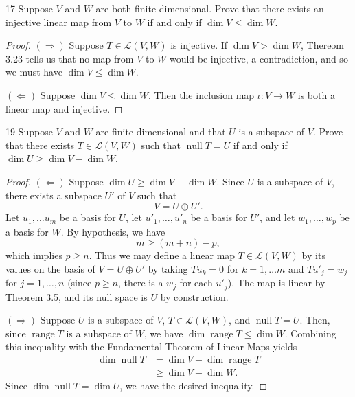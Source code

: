 \documentclass{extarticle}
\newenvironment{problem}[1]{\begin{prob*}{#1}{}}{\end{prob*}}
\newcommand{\Hom}{\mathcal{L}}
\DeclareMathOperator{\Null}{null}
\DeclareMathOperator{\Range}{range}
\begin{document}
\begin{problem}{17}
Suppose $V$ and $W$ are both finite-dimensional.  Prove that there exists an injective linear map from $V$ to $W$ if and only if $\dim V\leq \dim W$.  
\end{problem}
\begin{proof}
$(\Rightarrow)$  Suppose $T\in\Hom(V,W)$ is injective.  If $\dim V > \dim W$, Thereom 3.23 tells us that no map from $V$ to $W$ would be injective, a contradiction, and so we must have $\dim V\leq \dim W$.    
\par $(\Leftarrow)$  Suppose $\dim V\leq \dim W$.  Then the inclusion map $\iota:V\to W$ is both a linear map and injective.
\end{proof}

\begin{problem}{19}
Suppose $V$ and $W$ are finite-dimensional and that $U$ is a subspace of $V$.  Prove that there exists $T\in\Hom(V,W)$ such that $\Null T = U$ if and only if $\dim U\geq \dim V - \dim W$.
\end{problem}
\begin{proof}
$(\Leftarrow)$  Suppose $\dim U \geq \dim V- \dim W$.  Since $U$ is a subspace of $V$, there exists a subspace $U'$ of $V$ such that 
\begin{equation*}
V = U \oplus U'.
\end{equation*}
Let $u_1,\dots u_m$ be a basis for $U$, let $u'_1,\dots, u'_n$ be a basis for $U'$, and let $w_1,\dots, w_p$ be a basis for $W$.  By hypothesis, we have
\begin{equation*}
m \geq (m + n) - p,
\end{equation*}
which implies $p\geq n$.  Thus we may define a linear map $T\in\Hom(V, W)$ by its values on the basis of $V=U\oplus U'$ by taking $Tu_k = 0$ for $k = 1,\dots m$ and $Tu'_j = w_j$ for $j = 1,\dots, n$ (since $p\geq n$, there is a $w_j$ for each $u'_j$).  The map is linear by Theorem 3.5, and its null space is $U$ by construction.
\par $(\Rightarrow)$ Suppose $U$ is a subspace of $V$, $T\in\Hom(V,W)$, and $\Null T = U$.  Then, since $\Range T$ is a subspace of $W$, we have $\dim\Range T \leq \dim W$.  Combining this inequality with the Fundamental Theorem of Linear Maps yields
\begin{align*}
\dim \Null T &= \dim V - \dim\Range T\\
&\geq \dim V - \dim W.
\end{align*}
Since $\dim \Null T = \dim U$, we have the desired inequality.
\end{proof}
\end{document}
